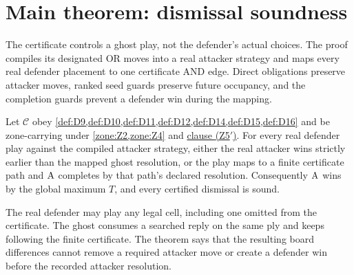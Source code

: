 \section{Main theorem: dismissal soundness}
\label{sec:main-theorem}

The certificate controls a ghost play, not the defender's actual choices.
The proof compiles its designated OR moves into a real attacker strategy and
maps every real defender placement to one certificate AND edge.  Direct
obligations preserve attacker moves, ranked seed guards preserve future
occupancy, and the completion guards prevent a defender win during the
mapping.

\begin{theorem}
\label{thm:T3}
\upshape
Let $\mathcal C$ obey \cref{def:D9,def:D10,def:D11,def:D12,def:D14,def:D15,def:D16}
and be zone-carrying under \cref{zone:Z2,zone:Z4} and
\hyperref[zone:Z5prime]{clause \textup{(Z5$'$)}}.  For every real defender
play against the compiled attacker strategy, either the real attacker wins
strictly earlier than the mapped ghost resolution, or the play maps to a
finite certificate path and $\mathrm{A}$ completes by that path's declared
resolution.  Consequently $\mathrm{A}$ wins by the global maximum $T$, and every
certified dismissal is sound.
\end{theorem}

\begin{plainterms}
The real defender may play any legal cell, including one omitted from the
certificate.  The ghost consumes a searched reply on the same ply and keeps
following the finite certificate.  The theorem says that the resulting board
differences cannot remove a required attacker move or create a defender win
before the recorded attacker resolution.
\end{plainterms}

